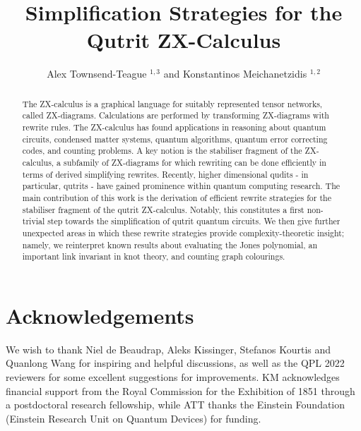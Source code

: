 \documentclass[submission,copyright,creativecommons]{eptcs}
\title{Simplification Strategies for the Qutrit ZX-Calculus}
\author{Alex Townsend-Teague $^{1, 3}$ and Konstantinos Meichanetzidis $^{1,2}$
	\institute{
		$^1$ Department of Computer Science, University of Oxford \\ 
		$^2$ Quantinuum and Cambridge Quantum Computing\\
		$^3$ Dahlem Center for Complex Quantum Systems, Freie Universit\"{a}t Berlin, 14195 Berlin, Germany}
	}
\begin{document}
\maketitle
\begin{abstract}
	The ZX-calculus is a graphical language for suitably represented tensor networks, called ZX-diagrams.
	Calculations are performed by transforming ZX-diagrams with rewrite rules.
	The ZX-calculus has found applications in reasoning about quantum circuits, condensed matter systems, quantum algorithms, quantum error correcting codes, and counting problems.
	A key notion is the stabiliser fragment of the ZX-calculus, a subfamily of ZX-diagrams for which rewriting can be done efficiently in terms of derived simplifying rewrites.
	Recently, higher dimensional qudits - in particular, qutrits - have gained prominence within quantum computing research.
	The main contribution of this work is the derivation of
	efficient rewrite strategies for the stabiliser fragment of the qutrit ZX-calculus.
	Notably, this constitutes a first non-trivial step towards the simplification of qutrit quantum circuits. We then give further unexpected areas in which these rewrite strategies provide complexity-theoretic insight; namely, we reinterpret known results about evaluating the Jones polynomial, an important link invariant in knot theory, and counting graph colourings.
\end{abstract}







\section{Acknowledgements}
We wish to thank Niel de Beaudrap, Aleks Kissinger, Stefanos 
Kourtis and Quanlong Wang for inspiring and helpful discussions, as well as the QPL 2022 reviewers for some excellent suggestions for improvements.
KM acknowledges financial support from the Royal Commission for the Exhibition of 1851 through a postdoctoral research fellowship, while ATT thanks the Einstein Foundation (Einstein Research Unit on Quantum Devices) for funding.
\end{document}
